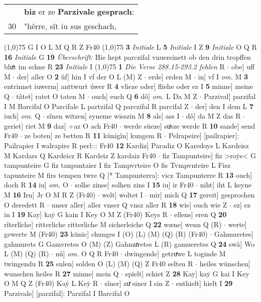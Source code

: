 \documentclass[8pt,a4paper,notitlepage]{article}
\begin{document}
\begin{table}[ht]
\begin{minipage}[t]{0.5\linewidth}
\begin{tabular}{rl}
 & \textbf{biz} er ze \textbf{Parzivale} \textbf{gesprach}:\\ 
30 & "hêrre, sît iu sus geschach,\\ 
\end{tabular}
\scriptsize
\line(1,0){75} \newline
G I O L M Q R Z Fr40 \newline
\line(1,0){75} \newline
\textbf{3} \textit{Initiale} L  \textbf{5} \textit{Initiale} I Z  \textbf{9} \textit{Initiale} O Q R  \textbf{16} \textit{Initiale} G  \textbf{19} \textit{Überschrift:} Hie hept parczifal vnuersinett ob den drin tropffen bluͯt im schne R  \textbf{23} \textit{Initiale} I  \newline
\line(1,0){75} \newline
\textbf{1} \textit{Die Verse 288.15-293.2 fehlen} R   $\cdot$ obe] uff M  $\cdot$ der] aller O \textbf{2} ûf] hin I vf der O L (M) Z  $\cdot$ erde] erden M  $\cdot$ in] vf I \textit{om.} M \textbf{3} entrinnet iuwerm] anttwurt úwer R \textbf{4} vlieze oder] fliehe oder ez I \textbf{5} minne] meine Q  $\cdot$ tâtet] ratet O taten M  $\cdot$ ouch] euch Q \textbf{6} dô] \textit{om.} L Da M Z  $\cdot$ Parzival] parzifal I M Barcifal O Parcifale L partzifal Q parczifal R parcifal Z  $\cdot$ der] den I dem L \textbf{7} iuch] \textit{om.} Q  $\cdot$ sînen witzen] syneme wisszin M \textbf{8} als] ass I  $\cdot$ dô] da M Z das R  $\cdot$ geriet] riet M \textbf{9} daz] ÷az O ach Fr40  $\cdot$ werde süeze] suͯsze werde R \textbf{10} sande] send Fr40  $\cdot$ ze boten] ze betten R \textbf{11} künigîn] kungem R  $\cdot$ Pelrapeire] [pailrapier]: Pailrapier I walrapire R perl::: Fr40 \textbf{12} Kardiz] Paradiz O Karedoys L Kardeisz M Kardars Q Kardeicz R Kardeiz Z kardaiz Fr40  $\cdot$ fiz Tampunteire] fiz >roẏs< G tampunteire G fiz tanpuntaier I fiz Tampvrteire O fis Tvmpvnteire L Fisz tapunteire M firs tempen twre Q [* Tampunterra]: vicz Tampunterre R \textbf{13} ouch] doch R \textbf{14} iu] \textit{om.} O  $\cdot$ solhe zinse] solhen zins I \textbf{15} iu] ir Fr40  $\cdot$ niht] iht L keyne M \textbf{16} Irn] Jr O M R Z (Fr40)  $\cdot$ welt] woltet I  $\cdot$ mir] mich Q \textbf{17} gereit] gesprochen O deredett R  $\cdot$ unser aller] aller vnser Q vnsz aller R \textbf{18} wie] ouch wie Z  $\cdot$ ez] ez in I \textbf{19} Kay] kaẏ G kain I Key O M Z (Fr40) Keys R  $\cdot$ ellens] eren Q \textbf{20} rîterlîche] ritterliche ritterliche M sicherleiche Q \textbf{22} wæne] wenn Q (R)  $\cdot$ werte] gewerte M (Fr40) \textbf{23} künic] chunges I (O) (L) (M) (Q) (R) (Fr40)  $\cdot$ Gahmuretes] gahmurets G Gamvretes O (M) (Z) Gahmuͯretes L (R) gamueretes Q \textbf{24} swâ] Wo L (M) (Q) (R)  $\cdot$ nû] \textit{om.} O Q R Fr40  $\cdot$ dwingende] getruͯwe L toginde M twingendu R \textbf{25} sulen] solden O (L) (M) (Q) Z Fr40 selten R  $\cdot$ heiles wünschen] wunschen heiles R \textbf{27} minne] mein Q  $\cdot$ spielt] schiet Z \textbf{28} Kay] kaẏ G kai I Key O M Q Z (Fr40) Kaý L Keẏ R  $\cdot$ sîner] zuͤ siner I sin Z  $\cdot$ enthielt] hielt I \textbf{29} Parzivale] [parzifal]: Parzifal I Barcifal O 
\end{minipage}
\end{table}
\end{document}
